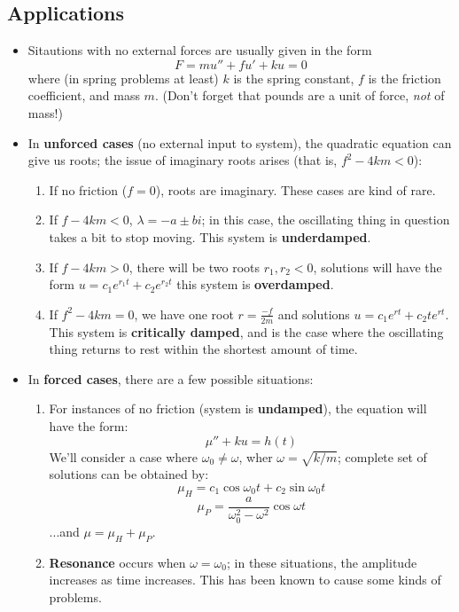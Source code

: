 \documentclass[10pt,letterpaper]{article}
\begin{document}
\subsection*{Applications} %
\begin{itemize}
\item Sitautions with no external forces are usually given in the form 
$$F = mu'' + fu' + ku = 0$$
where (in spring problems at least) $k$ is the spring constant, $f$ is the friction coefficient, and mass $m$. (Don't forget that pounds are a unit of force, \textit{not} of mass!)

\item In \textbf{unforced cases} (no external input to system), the quadratic equation can give us roots; the issue of imaginary roots arises (that is, $f^2-4km<0$): 
\begin{enumerate}
\item If no friction ($f=0$), roots are imaginary. These cases are kind of rare. 
\item If $f-4km<0$, $\lambda= -a\pm bi$; in this case, the oscillating thing in question takes a bit to stop moving. This system is \textbf{underdamped}.  
\item If $f-4km>0$, there will be two roots $r_1, r_2 < 0$, solutions will have the form $u=c_1e^{r_1t}+c_2e^{r_2t}$
this system is \textbf{overdamped}. 
\item If $f^2-4km=0$, we have one root $r=\frac{-f}{2m}$ and solutions $u=c_1e^{rt}+c_2te^{rt}$. This system is \textbf{critically damped}, and is the case where the oscillating thing returns to rest within the shortest amount of time. 
\end{enumerate}

\item In \textbf{forced cases}, there are a few possible situations: 
\begin{enumerate}
\item For instances of no friction (system is \textbf{undamped}), the equation will have the form: 
$$\mu'' + ku = h(t)$$
We'll consider a case where $\omega_0\neq \omega$, wher $\omega = \sqrt{k/m}$; complete set of solutions can be obtained by: 
$$\mu_H = c_1\cos\omega_0 t + c_2\sin \omega_0 t$$
$$\mu_P = \frac{a}{\omega_0^2-\omega^2}\cos\omega t$$
...and $\mu = \mu_H+\mu_P$. 
\item \textbf{Resonance} occurs when $\omega = \omega_0$; in these situations, the amplitude increases as time increases. This has been known to cause some kinds of problems. 

\end{enumerate}


\end{itemize}
\end{document}
